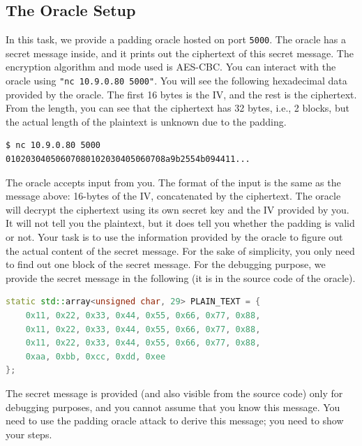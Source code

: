\subsection{The Oracle Setup} 

In this task, we provide a padding oracle hosted on port \texttt{5000}.
The oracle has a secret message inside, and it 
prints out the ciphertext of this secret message. The encryption algorithm
and mode used is AES-CBC.  You can interact with the oracle using \texttt{"nc 10.9.0.80 5000"}.
You will see the following hexadecimal data provided by the oracle. 
The first 16 bytes is the IV, and the rest is the ciphertext. 
From the length, you can see that the ciphertext has 32 bytes, i.e.,
2 blocks, but the actual length of the plaintext is unknown
due to the padding. 

\begin{lstlisting}
$ nc 10.9.0.80 5000
01020304050607080102030405060708a9b2554b094411...
\end{lstlisting}

The oracle accepts input from you. The format of the input 
is the same as the message above: 16-bytes of the IV, concatenated
by the ciphertext. The oracle will decrypt the ciphertext using 
its own secret key and the IV provided by you.
It will not tell you the plaintext, but
it does tell you whether the padding is valid or not. 
Your task is to use the information provided by the oracle
to figure out the actual content of the secret message. 
For the sake of simplicity, you only need to find out one block
of the secret message. For the debugging purpose,
we provide the secret message in the following (it is 
in the source code of the oracle).

\begin{lstlisting}[language=c++]
static std::array<unsigned char, 29> PLAIN_TEXT = {
    0x11, 0x22, 0x33, 0x44, 0x55, 0x66, 0x77, 0x88,
    0x11, 0x22, 0x33, 0x44, 0x55, 0x66, 0x77, 0x88,
    0x11, 0x22, 0x33, 0x44, 0x55, 0x66, 0x77, 0x88,
    0xaa, 0xbb, 0xcc, 0xdd, 0xee
};
\end{lstlisting}
 
The secret message is provided (and also visible from the source
code) only for debugging purposes, and you cannot assume that 
you know this message.  You need to use the 
padding oracle attack to derive this message; you need to 
show your steps. 

